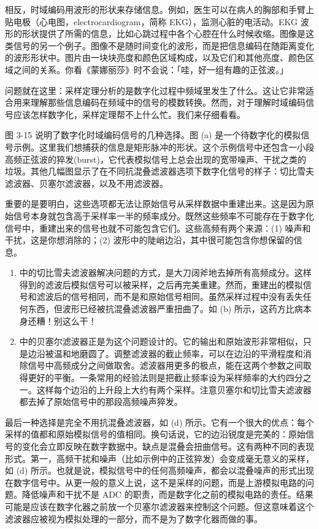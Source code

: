 相反，时域编码用波形的形状来存储信息。例如，医生可以在病人的胸部和手臂上贴电极（心电图，electrocardiogram，简称
EKG），监测心脏的电活动。EKG
波形的形状提供了所需的信息，比如心跳过程中各个心腔在什么时候收缩。图像是这类信号的另一个例子。图像不是随时间变化的波形，而是把信息编码在随距离变化的波形形状中。图片由一块块亮度和颜色区域构成，以及它们和其他亮度、颜色区域之间的关系。你看《蒙娜丽莎》时不会说：「哇，好一组有趣的正弦波。」

问题就在这里：采样定理分析的是数字化过程中频域里发生了什么。这让它非常适合用来理解那些信息编码在频域中的信号的模数转换。然而，对于理解时域编码信号应该怎样数字化，采样定理帮不上什么忙。我们来仔细看看。

图 3-15 说明了数字化时域编码信号的几种选择。图 (a)
是一个待数字化的模拟信号示例。这里我们想捕获的信息是矩形脉冲的形状。这个示例信号中还包含一小段高频正弦波的猝发(burst)，它代表模拟信号上总会出现的宽带噪声、干扰之类的垃圾。其他几幅图显示了在不同抗混叠滤波器选项下数字化信号的样子：切比雪夫滤波器、贝塞尔滤波器，以及不用滤波器。

重要的是要明白，这些选项都无法让原始信号从采样数据中重建出来。这是因为原始信号本身就包含高于采样率一半的频率成分。既然这些频率不可能存在于数字化信号中，重建出来的信号也就不可能包含它们。这些高频有两个来源：(1)
噪声和干扰，这是你想消除的；(2)
波形中的陡峭边沿，其中很可能包含你想保留的信息。

\begin{enumerate}
\def\labelenumi{(\alph{enumi})}
\setcounter{enumi}{1}
\item
  中的切比雪夫滤波器解决问题的方式，是大刀阔斧地去掉所有高频成分。这样得到的滤波后模拟信号可以被采样，之后再完美重建。然而，重建出的模拟信号和滤波后的信号相同，而不是和原始信号相同。虽然采样过程中没有丢失任何东西，但波形已经被抗混叠滤波器严重扭曲了。如
  (b) 所示，这药方比病本身还糟！别这么干！
\item
  中的贝塞尔滤波器正是为这个问题设计的。它的输出和原始波形非常相似，只是边沿被温和地磨圆了。调整滤波器的截止频率，可以在边沿的平滑程度和消除信号中高频成分之间做取舍。滤波器用更多的极点，能在这两个参数之间取得更好的平衡。一条常用的经验法则是把截止频率设为采样频率的大约四分之一。这样每个边沿的上升段上大约有两个采样。注意贝塞尔和切比雪夫滤波器都去掉了原始信号中的那段高频噪声猝发。
\end{enumerate}

最后一种选择是完全不用抗混叠滤波器，如 (d)
所示。它有一个很大的优点：每个采样的值都和原始模拟信号的值相同。换句话说，它的边沿锐度是完美的：原始信号的变化会立即反映在数字数据中。缺点是混叠会扭曲信号。这有两种不同的表现形式。第一，高频干扰和噪声（比如示例中的正弦猝发）会变成毫无意义的采样，如
(d)
所示。也就是说，模拟信号中的任何高频噪声，都会以混叠噪声的形式出现在数字信号中。从更一般的意义上说，这不是采样的问题，而是上游模拟电路的问题。降低噪声和干扰不是
ADC
的职责，而是数字化之前的模拟电路的责任。结果可能是应该在数字化器之前放一个贝塞尔滤波器来控制这个问题。但这意味着这个滤波器应被视为模拟处理的一部分，而不是为了数字化器而做的事。

